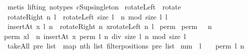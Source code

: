 \begin{isabellebody}
\isamarkupfalse%
\ {\isacharparenleft}metis\ {\isacharparenleft}lifting{\isacharcomma}\ no{\isacharunderscore}types{\isacharparenright}\ cSup{\isacharunderscore}singleton{\isacharparenright}%
\endisatagproof
{\isafoldproof}%
%
\isadelimproof
%
\endisadelimproof
%
\isamarkuptrue%
\isamarkupfalse%
\ {\isachardoublequoteopen}rotateLeft\ {\isacharequal}{\isacharequal}\ rotate{\isachardoublequoteclose}\isanewline
{}\isamarkupfalse%
\ {\isachardoublequoteopen}rotateRight\ n\ l\ {\isacharequal}{\isacharequal}\ rotateLeft\ {\isacharparenleft}size\ l\ {\isacharminus}\ {\isacharparenleft}n\ mod\ {\isacharparenleft}size\ l{\isacharparenright}{\isacharparenright}{\isacharparenright}\ l{\isachardoublequoteclose}\isanewline
{}\isamarkupfalse%
\ {\isachardoublequoteopen}insertAt\ x\ l\ n\ {\isacharequal}{\isacharequal}\ rotateRight\ n\ {\isacharparenleft}x{\isacharhash}{\isacharparenleft}rotateLeft\ n\ l{\isacharparenright}{\isacharparenright}{\isachardoublequoteclose}\isanewline
\isanewline
\isanewline
{}\isamarkupfalse%
\ perm{}\ \isanewline
{\isachardoublequoteopen}perm{}\ {\isacharbrackleft}{\isacharbrackright}\ {\isacharequal}\ {\isacharparenleft}{\isacharpercent}n{\isachardot}\ {\isacharbrackleft}{\isacharbrackright}{\isacharparenright}{\isachardoublequoteclose}\ {\isacharbar}\ \isanewline
{\isachardoublequoteopen}perm{}\ {\isacharparenleft}x{\isacharhash}l{\isacharparenright}\ {\isacharequal}\ {\isacharparenleft}{\isacharpercent}n{\isachardot}\ insertAt\ x\ {\isacharparenleft}{\isacharparenleft}perm{}\ l{\isacharparenright}\ {\isacharparenleft}n\ div\ {\isacharparenleft}{}{\isacharplus}size\ l{\isacharparenright}{\isacharparenright}{\isacharparenright}\ {\isacharparenleft}n\ mod\ {\isacharparenleft}{}{\isacharplus}size\ l{\isacharparenright}{\isacharparenright}{\isacharparenright}{\isachardoublequoteclose}\isanewline
\isanewline
{}\isamarkupfalse%
\ {\isachardoublequoteopen}takeAll\ pre\ list\ {\isacharequal}{\isacharequal}\ map\ {\isacharparenleft}nth\ list{\isacharparenright}\ {\isacharparenleft}filterpositions{}\ pre\ list{\isacharparenright}{\isachardoublequoteclose}\isanewline
\isanewline
{}\isamarkupfalse%
\ mm{}{}{\isacharcolon}\ \ {\isachardoublequoteopen}l\ {\isasymnoteq}\ {\isacharbrackleft}{\isacharbrackright}{\isachardoublequoteclose}\ \ {\isachardoublequoteopen}perm{}\ l\ n\ {\isasymnoteq}\ {\isacharbrackleft}{\isacharbrackright}{\isachardoublequoteclose}\ \isanewline

\end{isabellebody}
